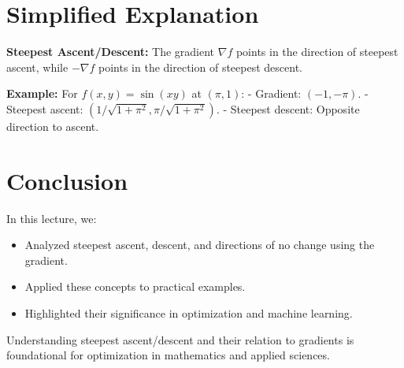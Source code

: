 \documentclass{article}
\begin{document}
\section*{Simplified Explanation}

\textbf{Steepest Ascent/Descent:}
The gradient $\nabla f$ points in the direction of steepest ascent, while $-\nabla f$ points in the direction of steepest descent.

\textbf{Example:}
For $f(x, y) = \sin(xy)$ at $(\pi, 1)$:
- Gradient: $(-1, -\pi)$.
- Steepest ascent: $(1/\sqrt{1+\pi^2}, \pi/\sqrt{1+\pi^2})$.
- Steepest descent: Opposite direction to ascent.

\section*{Conclusion}

In this lecture, we:
\begin{itemize}
  \item Analyzed steepest ascent, descent, and directions of no change using the gradient.
  \item Applied these concepts to practical examples.
  \item Highlighted their significance in optimization and machine learning.
\end{itemize}

Understanding steepest ascent/descent and their relation to gradients is foundational for optimization in mathematics and applied sciences.
\end{document}

